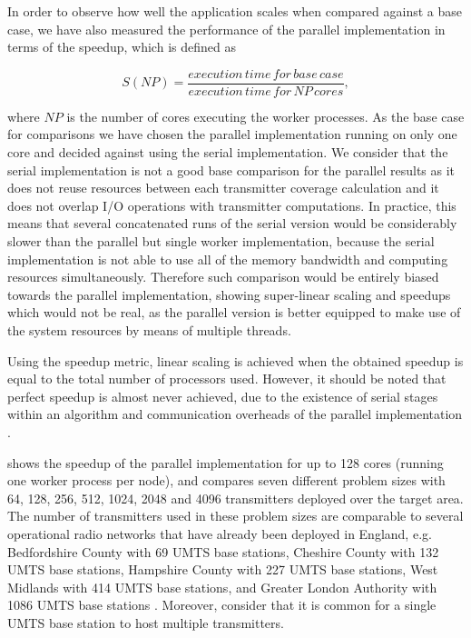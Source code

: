 In order to observe how well the application scales when compared
against a base case, we have also measured the performance of the
parallel implementation in terms of the speedup, which is defined
as

\begin{equation}
S(NP)=\frac{execution\, time\, for\, base\, case}{execution\, time\, for\, NP\, cores},\label{eq:speedup}
\end{equation}


\noindent where $NP$ is the number of cores executing the worker
processes. As the base case for comparisons we have chosen the parallel
implementation running on only one core and decided against using
the serial implementation. We consider that the serial implementation
is not a good base comparison for the parallel results as it does
not reuse resources between each transmitter coverage calculation
and it does not overlap I/O operations with transmitter computations.
In practice, this means that several concatenated runs of the serial
version would be considerably slower than the parallel but single
worker implementation, because the serial implementation is not able
to use all of the memory bandwidth and computing resources simultaneously.
Therefore such comparison would be entirely biased towards the parallel
implementation, showing super-linear scaling and speedups which would
not be real, as the parallel version is better equipped to make use
of the system resources by means of multiple threads.

Using the speedup metric, linear scaling is achieved when the obtained
speedup is equal to the total number of processors used. However,
it should be noted that perfect speedup is almost never achieved,
due to the existence of serial stages within an algorithm and communication
overheads of the parallel implementation \cite{Cruz_Particle.Flow.Simulation:2010}. 

 shows the speedup of the
parallel implementation for up to 128 cores (running one worker process
per node), and compares seven different problem sizes with 64, 128,
256, 512, 1024, 2048 and 4096 transmitters deployed over the target
area. The number of transmitters used in these problem sizes are comparable
to several operational radio networks that have already been deployed
in England, e.g. Bedfordshire County with 69 UMTS base stations, Cheshire
County with 132 UMTS base stations, Hampshire County with 227 UMTS
base stations, West Midlands with 414 UMTS base stations, and Greater
London Authority with 1086 UMTS base stations \cite{Number_of_base_stations_in_England}.
Moreover, consider that it is common for a single UMTS base station
to host multiple transmitters. 

